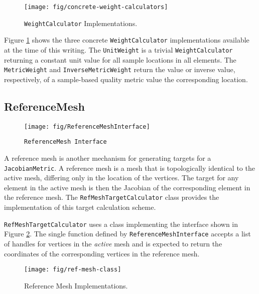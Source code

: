 \documentclass{article}
\begin{document}
\begin{figure}[htb]
\begin{center}
\texttt{[image: fig/concrete-weight-calculators]}
\caption{\texttt{WeightCalculator} Implementations.\label{fig:weight-concrete}}
\end{center}
\end{figure}

Figure \ref{fig:weight-concrete} shows the three concrete \texttt{WeightCalculator} implementations available at the time of this writing.  The \texttt{UnitWeight} is a trivial \texttt{WeightCalculator} returning a constant unit value for all sample locations in all elements.  The \texttt{MetricWeight} and \texttt{InverseMetricWeight} return the value or inverse value, respectively, of a sample-based quality metric value the corresponding location.

\subsection{ReferenceMesh}
\label{sec:RefMesh}

\begin{figure}[htb]
\begin{center}
\texttt{[image: fig/ReferenceMeshInterface]}
\caption{\texttt{ReferenceMesh Interface}\label{fig:refmeshiface}}
\end{center}
\end{figure}

A reference mesh is another mechanism for generating targets for a \texttt{JacobianMetric}.  A reference mesh is a mesh that is topologically identical to the active mesh, differing only in the location of the vertices.  The target for any element in the active mesh is then the Jacobian of the corresponding element in the reference mesh.  The \texttt{RefMeshTargetCalculator} class provides the implementation of this target calculation scheme.

\texttt{RefMeshTargetCalculator} uses a class implementing the interface shown in Figure \ref{fig:refmeshiface}.  The single function defined by \texttt{ReferenceMeshInterface} accepts a list of handles for vertices in the \emph{active} mesh and is expected to return the coordinates of the corresponding vertices in the reference mesh.

\begin{figure}[htb]
\begin{center}
\texttt{[image: fig/ref-mesh-class]}
\caption{Reference Mesh Implementations.\label{fig:refmesh}}
\end{center}
\end{figure}
\end{document}
